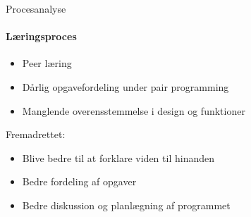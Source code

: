 \begin{frame}{Procesanalyse}
	\framesubtitle{Læringsproces}
	
	\begin{itemize}
		\item Peer læring
		\item Dårlig opgavefordeling under pair programming
		\item Manglende overensstemmelse i design og funktioner
	\end{itemize}
		Fremadrettet:
	\begin{itemize}
		\item Blive bedre til at forklare viden til hinanden
		\item Bedre fordeling af opgaver
		\item Bedre diskussion og planlægning af programmet
	\end{itemize}


\end{frame}